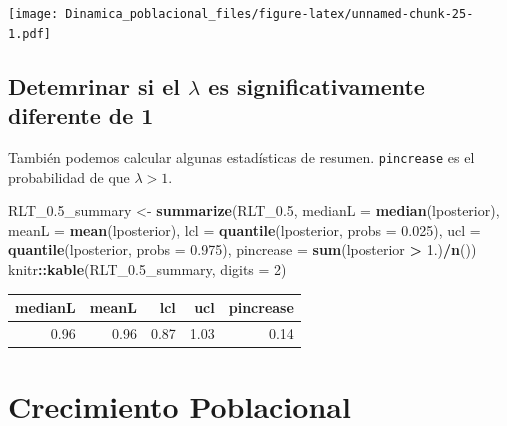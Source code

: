 \documentclass[
]{book}
\newenvironment{Shaded}{\begin{snugshade}}{\end{snugshade}}
\newcommand{\AttributeTok}[1]{\textcolor[rgb]{0.13,0.29,0.53}{#1}}
\newcommand{\DecValTok}[1]{\textcolor[rgb]{0.00,0.00,0.81}{#1}}
\newcommand{\FloatTok}[1]{\textcolor[rgb]{0.00,0.00,0.81}{#1}}
\newcommand{\FunctionTok}[1]{\textcolor[rgb]{0.13,0.29,0.53}{\textbf{#1}}}
\newcommand{\NormalTok}[1]{#1}
\newcommand{\OtherTok}[1]{\textcolor[rgb]{0.56,0.35,0.01}{#1}}
\newcommand{\SpecialCharTok}[1]{\textcolor[rgb]{0.81,0.36,0.00}{\textbf{#1}}}
\theoremstyle{definition}
\theoremstyle{definition}
\theoremstyle{definition}
\theoremstyle{definition}
\theoremstyle{remark}
\begin{document}
\texttt{[image: Dinamica\_poblacional\_files/figure-latex/unnamed-chunk-25-1.pdf]}

\hypertarget{detemrinar-si-el-lambda-es-significativamente-diferente-de-1}{%
\section{\texorpdfstring{Detemrinar si el \(\lambda\) es significativamente diferente de 1}{Detemrinar si el \textbackslash lambda es significativamente diferente de 1}}\label{detemrinar-si-el-lambda-es-significativamente-diferente-de-1}}

También podemos calcular algunas estadísticas de resumen. \texttt{pincrease} es el
probabilidad de que \(\lambda > 1\).

\begin{Shaded}
\begin{Highlighting}[]
\NormalTok{RLT\_0}\FloatTok{.5}\NormalTok{\_summary }\OtherTok{\textless{}{-}} \FunctionTok{summarize}\NormalTok{(RLT\_0}\FloatTok{.5}\NormalTok{,}
                             \AttributeTok{medianL =} \FunctionTok{median}\NormalTok{(lposterior),}
                             \AttributeTok{meanL =} \FunctionTok{mean}\NormalTok{(lposterior),}
                             \AttributeTok{lcl =} \FunctionTok{quantile}\NormalTok{(lposterior, }\AttributeTok{probs =} \FloatTok{0.025}\NormalTok{),}
                             \AttributeTok{ucl =} \FunctionTok{quantile}\NormalTok{(lposterior, }\AttributeTok{probs =} \FloatTok{0.975}\NormalTok{),}
                             \AttributeTok{pincrease =} \FunctionTok{sum}\NormalTok{(lposterior }\SpecialCharTok{\textgreater{}} \FloatTok{1.}\NormalTok{)}\SpecialCharTok{/}\FunctionTok{n}\NormalTok{())}
\NormalTok{knitr}\SpecialCharTok{::}\FunctionTok{kable}\NormalTok{(RLT\_0}\FloatTok{.5}\NormalTok{\_summary, }\AttributeTok{digits =} \DecValTok{2}\NormalTok{)}
\end{Highlighting}
\end{Shaded}

\begin{tabular}{r|r|r|r|r}
\hline
medianL & meanL & lcl & ucl & pincrease\\
\hline
0.96 & 0.96 & 0.87 & 1.03 & 0.14\\
\hline
\end{tabular}

\hypertarget{crecimiento-poblacional}{%
\chapter{Crecimiento Poblacional}\label{crecimiento-poblacional}}
\end{document}
